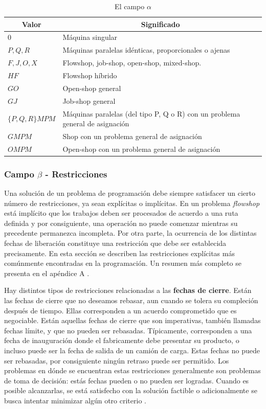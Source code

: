 \documentclass[spanish,draft,12pt,headsepline,footsepline,paper=letter]{scrreprt}
\begin{document}
\begin{table}
\centering
\begin{tabular}{l p{10cm}}
\toprule
  \multicolumn{1}{c}{Valor} & \multicolumn{1}{c}{Significado} \\
  \midrule
  $0$ & Máquina singular \\
  $P,Q,R$ & Máquinas paralelas idénticas, proporcionales o ajenas \\
  $F,J,O,X$ & Flowshop, job-shop, open-shop, mixed-shop. \\
  $HF$ & Flowshop híbrido \\
  $GO$ & Open-shop general \\
  $GJ$ & Job-shop general \\
  $\{P,Q,R\}MPM$ & Máquinas paralelas (del tipo P, Q o R) con un problema general de asignación \\
  $G M P M$ & Shop con un problema general de asignación \\
  $O M P M$ & Open-shop con un problema general de asignación \\
  \bottomrule
\end{tabular}
  \caption{El campo $\alpha$}
  \label{tab:notation_alpha}
\end{table}

\subsubsection{Campo $\beta$ - Restricciones}

Una solución de un problema de programación debe siempre satisfacer un cierto número de restricciones, ya sean explícitas o implícitas. En un problema \textit{flowshop} está implícito que los trabajos deben ser procesados de acuerdo a una ruta definida y por consiguiente, una operación no puede comenzar mientras su precedente permanezca incompleta. 
Por otra parte, la ocurrencia de los distintas fechas de liberación constituye una restricción que debe ser establecida precisamente. En esta sección se describen las restricciones explícitas más comúnmente encontradas en la programación. Un resumen más completo se presenta en el apéndice A \citep[p.~9-10]{TKindt2002}. 

Hay distintos tipos de restricciones relacionadas a las \textbf{fechas de cierre}. Están las fechas de cierre que no deseamos rebasar, aun cuando se tolera su compleción después de tiempo. Ellas corresponden a un acuerdo comprometido que es negociable. Están aquellas fechas de cierre que son imperativas, también llamadas fechas límite, y que no pueden ser rebasadas. Típicamente, corresponden a una fecha de inauguración donde el fabricamente debe presentar su producto, o incluso puede ser la fecha de salida de un camión de carga. Estas fechas no puede ser rebasadas, por consiguiente ningún retraso puede ser permitido. Los problemas en dónde se encuentran estas restricciones generalmente son problemas de toma de decisión: estás fechas pueden o no pueden ser logradas. Cuando es posible alcanzarlas, se está satisfecho con la solución factible o adicionalmente se busca intentar minimizar algún otro criterio \citep[p.~10]{TKindt2002}.
\end{document}
